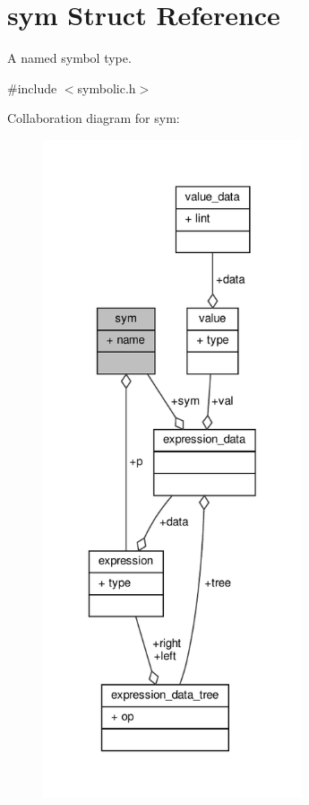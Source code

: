 \hypertarget{structsym}{}\section{sym Struct Reference}
\label{structsym}


A named symbol type.  




{\ttfamily \#include $<$symbolic.\+h$>$}



Collaboration diagram for sym\+:
\nopagebreak
\begin{figure}[H]
\begin{center}
\leavevmode
\includegraphics[height=550pt]{structsym__coll__graph}
\end{center}
\end{figure}
